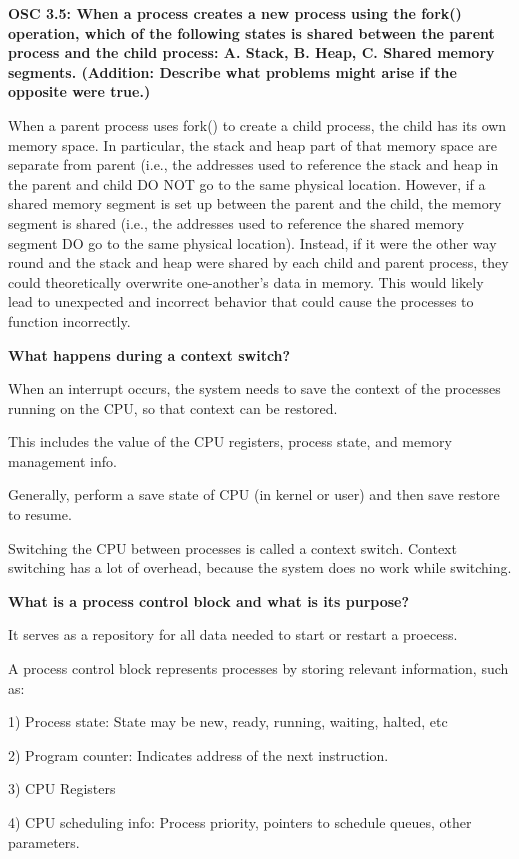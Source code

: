 \documentclass[8pt,landscape]{article}
\begin{document}
\begin{multicols}{3}
\begin{tiny}
\textbf{OSC 3.5: When a process creates a new process using the
fork() operation, which of the following states
is shared between the parent process and the child process: A. Stack, B. Heap, C. Shared memory segments.
(Addition: Describe what problems might arise if the opposite were true.)}

When a parent process uses
fork()
to create a child process, the child has its own memory space.
In particular, the stack and heap part of that memory space are separate from parent (i.e., the addresses used
to reference the stack and heap in the parent and child DO NOT go to the same physical location. However,
if a shared memory segment is set up between the parent and the child, the memory segment is shared (i.e.,
the addresses used to reference the shared memory segment DO go to the same physical location). Instead, if
it were the other way round and the stack and heap were shared by each child and parent process, they could
theoretically overwrite one-another’s data in memory.  This would likely lead to unexpected and incorrect
behavior that could cause the processes to function incorrectly.

\textbf{What happens during a context switch?}

When an interrupt occurs, the system needs to save the context of the processes running on the CPU,
so that context can be restored.

This includes the value of the CPU registers, process state, and memory management info.

Generally, perform a save state of CPU (in kernel or user) and then save restore to resume.

Switching the CPU between processes is called a context switch. Context switching has a lot of 
overhead, because the system does no work while switching.

\textbf{What is a process control block and what is its purpose?}

It serves as a repository for all data needed to start or restart a proecess.

A process control block represents processes by storing relevant information, such as:

1) Process state: State may be new, ready, running, waiting, halted, etc

2) Program counter: Indicates address of the next instruction.

3) CPU Registers

4) CPU scheduling info: Process priority, pointers to schedule queues, other parameters.


\end{tiny}
\end{multicols}
\end{document}
